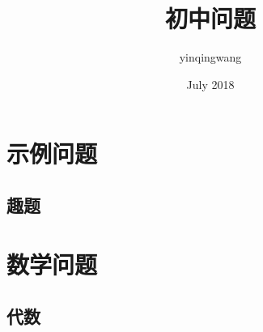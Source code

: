 \documentclass[UTF8]{article}
\title{初中问题}
\author{yinqingwang }
\date{July 2018}
\begin{document}
        \maketitle
        \tableofcontents

    \section{示例问题}
    \subsection{趣题}

    \section{数学问题}
    \subsection{代数}
\end{document}
